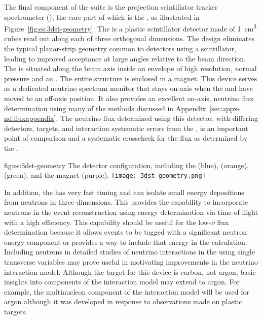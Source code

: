 The final component of the   suite is the \threed projection scintillator tracker spectrometer (),  the core part of which is the , as illustrated in Figure~\ref{fig:es:3dst-geometry}.  The  is a plastic scintillator detector made of \SI{1}{\cubic\centi\meter} cubes read out along each of three orthogonal dimensions.  The design eliminates the typical planar-strip geometry common to detectors using a scintillator, leading to improved acceptance at large angles relative to the beam direction.  The  is situated along the beam axis inside an envelope of high resolution, normal pressure  and an .  The entire structure is enclosed in a magnet. This device serves as a dedicated  neutrino spectrum monitor that stays on-axis when the    and  have moved to an off-axis position. 
It also provides an excellent on-axis, neutrino flux determination using many of the methods discussed in Appendix~\ref{sec:appx-nd:fluxappendix}. The neutrino flux determined using this detector, with  differing detectors, targets, and interaction systematic errors from the , is an important point of comparison and a systematic crosscheck for the flux as determined by the .

\begin{dunefigure}{fig:es:3dst-geometry}
{The  detector configuration, including the  (blue),  (orange),  (green), and the magnet (purple).}
  \texttt{[image: 3dst-geometry.png]}
\end{dunefigure}




In addition, the  has very fast timing and can isolate small energy depositions from neutrons in three dimensions.  This provides the capability to  incorporate neutrons in the event reconstruction using energy determination via time-of-flight with a high efficiency. This capability should be useful for the low-$\nu$ flux determination because it allows events to be tagged with a significant neutron energy component or provides a way to include that energy in the calculation.  Including neutrons in detailed studies of neutrino interactions in the  using single transverse variables may prove useful in motivating improvements in the neutrino interaction model. Although the target for this device is carbon, not argon, basic insights into components of the interaction model may extend to argon.  For example, the multinucleon component of the interaction model will be used for argon although it was developed in response to observations made on plastic targets.   



